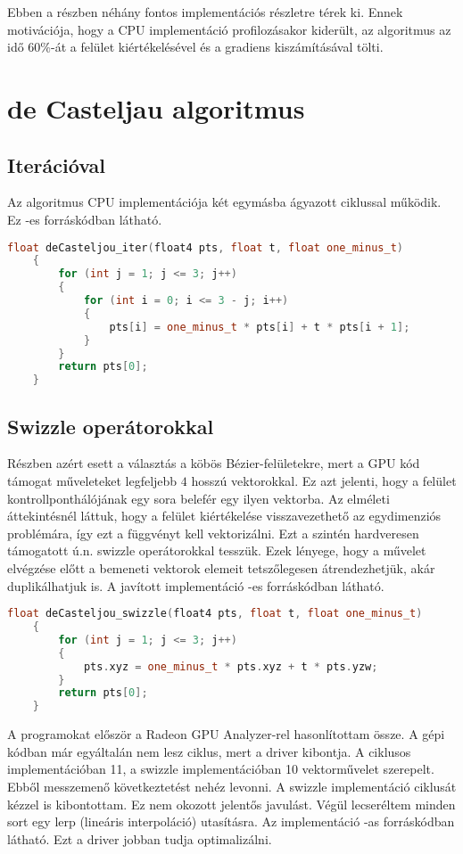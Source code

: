 Ebben a részben néhány fontos implementációs részletre térek ki. Ennek motivációja, hogy a CPU implementáció profilozásakor kiderült, az algoritmus az idő $60\%$-át a felület kiértékelésével és a gradiens kiszámításával tölti.

\section{de Casteljau algoritmus}
\subsection{Iterációval}
Az algoritmus CPU implementációja két egymásba ágyazott ciklussal működik. Ez -es forráskódban látható.

\begin{lstlisting}[caption={de Casteljau iterációval}, language={C++}, label={lst:iter}]
	float deCasteljou_iter(float4 pts, float t, float one_minus_t)
	{
		for (int j = 1; j <= 3; j++)
		{
			for (int i = 0; i <= 3 - j; i++)
			{
				pts[i] = one_minus_t * pts[i] + t * pts[i + 1];
			}
		}
		return pts[0];
	}
\end{lstlisting}

\subsection{Swizzle operátorokkal}
Részben azért esett a választás a köbös Bézier-felületekre, mert a GPU kód támogat műveleteket legfeljebb $4$ hosszú vektorokkal. Ez azt jelenti, hogy a felület kontrollponthálójának egy sora belefér egy ilyen vektorba. Az elméleti áttekintésnél láttuk, hogy a felület kiértékelése visszavezethető az egydimenziós problémára, így ezt a függvényt kell vektorizálni. Ezt a szintén hardveresen támogatott ú.n. swizzle operátorokkal tesszük. Ezek lényege, hogy a művelet elvégzése előtt a bemeneti vektorok elemeit tetszőlegesen átrendezhetjük, akár duplikálhatjuk is. A javított implementáció -es forráskódban látható.

\begin{lstlisting}[caption={de Casteljau swizzle operátorokkal}, language={C++}, label={lst:swizzle}]
	float deCasteljou_swizzle(float4 pts, float t, float one_minus_t)
	{
		for (int j = 1; j <= 3; j++)
		{
			pts.xyz = one_minus_t * pts.xyz + t * pts.yzw;
		}
		return pts[0];
	}
\end{lstlisting}

A programokat először a Radeon GPU Analyzer-rel hasonlítottam össze. A gépi kódban már egyáltalán nem lesz ciklus, mert a driver kibontja. A ciklusos implementációban 11, a swizzle implementációban 10 vektorművelet szerepelt. Ebből messzemenő következtetést nehéz levonni. A swizzle implementáció ciklusát kézzel is kibontottam. Ez nem okozott jelentős javulást. Végül lecseréltem minden sort egy lerp (lineáris interpoláció) utasításra. Az implementáció -as forráskódban látható. Ezt a driver jobban tudja optimalizálni. 

